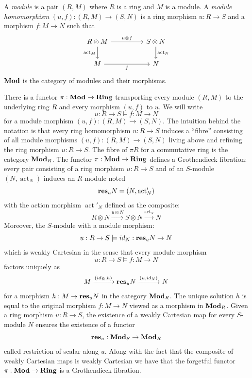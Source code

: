 \documentclass[8pt]{article}
\theoremstyle{definition}
\theoremstyle{definition}
\theoremstyle{definition}
\theoremstyle{definition}
\theoremstyle{definition}
\theoremstyle{definition}
\theoremstyle{definition}
\theoremstyle{definition}
\theoremstyle{definition}
\theoremstyle{definition}
\theoremstyle{definition}
\theoremstyle{definition}
\theoremstyle{definition}
\theoremstyle{definition}
\theoremstyle{question}
\begin{document}
A \emph{module} is a pair $(R, M)$ where $R$ is a ring and $M$ is a module. A \emph{module homomorphism} $(u, f) : (R, M) \to (S, N)$
is a ring morphism $u : R \to S$ and a morphism $f : M \to N$ such that
\[
\begin{tikzcd}
  R \otimes M \ar[rr, "u \otimes f"] \ar[d, "\operatorname{act}_M"'] && S \otimes N \ar[d, "\operatorname{act}_N"] \\
  M \ar[rr, "f"'] && N
\end{tikzcd}
\]
${\bf Mod}$ is the category of modules and their morphisms.

There is a functor $\pi : {\bf Mod} \to {\bf Ring}$ transporting every module $(R, M)$ to the underlying ring $R$ and every morphism
$(u, f)$ to $u$. We will write
\[
u : R \to S \models f : M \to N
\]
for a module morphism $(u, f) : (R, M) \to (S, N)$. The intuition behind the notation is that every ring homomorphism
$u : R \to S$ induces a ``fibre'' consisting of all module morphisms $(u, f) : (R, M) \to (S, N)$ living above and refining the ring morphism
$u : R \to S$. The fibre of $\pi R$ for a commutative ring is the category ${\bf Mod}_R$. The functor $\pi : {\bf Mod} \to {\bf Ring}$ defines 
a Grothendieck fibration: every pair consisting of a ring morphism $u : R \to S$ and of an $S$-module $(N, \operatorname{act}_N)$ induces
an $R$-module noted 
\[{\bf res}_u N = (N, \operatorname{act}'_N)
\]
with the action morphism $\operatorname{act}'_N$ defined as the composite:
\[
R \otimes N \xrightarrow{u \otimes N} S \otimes N \xrightarrow{\operatorname{act}_N} N
\]
Moreover, the $S$-module with a module morphism:
\[
u : R \to S \models id_{N} : {\bf res}_u N \to N
\]
which is weakly Cartesian in the sense that every module morphism
\[
u : R \to S \models f : M \to N
\]
factors uniquely as 
\[
M \xrightarrow{(id_{R}, h)} {\bf res}_u N \xrightarrow{(u, id_N)} N
\]
for a morphism $h : M \to {\bf res}_u N$ in the category ${\bf Mod}_R$. The unique solution $h$ is equal to the original morphism $f : M \to N$
viewed as a morphism in ${\bf Mod}_R$. Given a ring morphism $u : R \to S$, the existence of a weakly Cartesian map for every $S$-module $N$
ensures the existence of a functor
\[
{\bf res}_u : {\bf Mod}_S \to {\bf Mod}_R
\]
called restriction of scalar along $u$. Along with the fact that the composite of weakly Cartesian maps is weakly Cartesian we have that
the forgetful functor $\pi : {\bf Mod} \to {\bf Ring}$ is a Grothendieck fibration.
\end{document}
